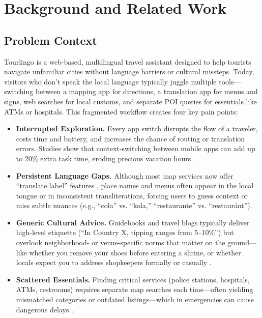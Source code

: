\chapter{Background and Related Work}
\begin{sloppypar}
\section{Problem Context}
Tourlingo is a web-based, multilingual travel assistant designed to help tourists navigate unfamiliar cities without language barriers or cultural missteps. Today, visitors who don’t speak the local language typically juggle multiple tools—switching between a mapping app for directions, a translation app for menus and signs, web searches for local customs, and separate POI queries for essentials like ATMs or hospitals. This fragmented workflow creates four key pain points:

\begin{itemize}
  \item \textbf{Interrupted Exploration.} Every app switch disrupts the flow of a traveler, costs time and battery, and increases the chance of routing or translation errors. Studies show that context-switching between mobile apps can add up to 20\% extra task time, eroding precious vacation hours \cite{mobileit2024}.
  \item \textbf{Persistent Language Gaps.} Although most map services now offer “translate label” features \cite{googlemaps}\cite{applemaps}, place names and menus often appear in the local tongue or in inconsistent transliterations, forcing users to guess context or miss subtle nuances (e.g., “cola” vs. “kola,” “restaurante” vs. “restauránt”).
  \item \textbf{Generic Cultural Advice.} Guidebooks and travel blogs typically deliver high-level etiquette (“In Country X, tipping ranges from 5–10\%”) but overlook neighborhood- or venue-specific norms that matter on the ground—like whether you remove your shoes before entering a shrine, or whether locals expect you to address shopkeepers formally or casually \cite{lonelyplanet}\cite{culturetrip}.
  \item \textbf{Scattered Essentials.} Finding critical services (police stations, hospitals, ATMs, restrooms) requires separate map searches each time—often yielding mismatched categories or outdated listings—which in emergencies can cause dangerous delays \cite{googlemaps}.
\end{itemize}


\end{sloppypar}
